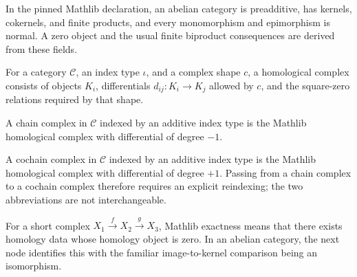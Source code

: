 \begin{definition}
  \label{def:mathlib-abelian}
  \mathlibok
  In the pinned Mathlib declaration, an abelian category is preadditive, has
  kernels, cokernels, and finite products, and every monomorphism and
  epimorphism is normal.  A zero object and the usual finite biproduct
  consequences are derived from these fields.
\end{definition}

\begin{definition}
  \label{def:mathlib-homological-complex}
  \mathlibok
  For a category $\mathcal C$, an index type $\iota$, and a complex shape
  $c$, a homological complex consists of objects $K_i$, differentials
  $d_{ij}:K_i\to K_j$ allowed by $c$, and the square-zero relations required
  by that shape.
\end{definition}

\begin{definition}
  \label{def:mathlib-chain-complex}
  \mathlibok
  A chain complex in $\mathcal C$ indexed by an additive index type is the
  Mathlib homological complex with differential of degree $-1$.
\end{definition}

\begin{definition}
  \label{def:mathlib-cochain-complex}
  \mathlibok
  A cochain complex in $\mathcal C$ indexed by an additive index type is the
  Mathlib homological complex with differential of degree $+1$.  Passing from a
  chain complex to a cochain complex therefore requires an explicit reindexing;
  the two abbreviations are not interchangeable.
\end{definition}

\begin{definition}
  \label{def:mathlib-short-complex-exact}
  \mathlibok
  For a short complex $X_1\xrightarrow{f}X_2\xrightarrow{g}X_3$, Mathlib
  exactness means that there exists homology data whose homology object is
  zero.  In an abelian category, the next node identifies this with the
  familiar image-to-kernel comparison being an isomorphism.
\end{definition}

